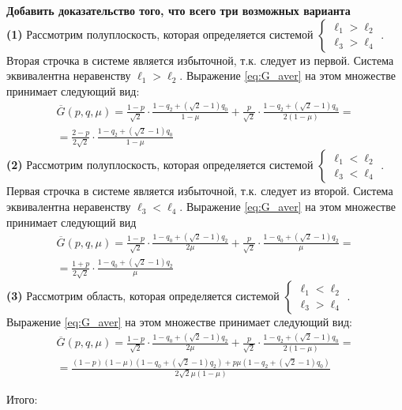 \textbf{Добавить доказательство того, что всего три возможных варианта}\\
\textbf{(1)} 
Рассмотрим полуплоскость, которая определяется системой
$
	\begin{cases}
		\ell_1 > \ell_2 \\
		\ell_3 > \ell_4
	\end{cases}.
$
Вторая строчка в системе является избыточной, т.к. следует из первой.
Система эквивалентна неравенству $\ell_1 > \ell_2$. Выражение \eqref{eq:G_aver} на этом множестве принимает следующий вид:
\begin{gather*}
	\overline G(p,q,\mu)=
	\frac{1-p}{\sqrt{2}} \cdot \frac{1-q_2+(\sqrt{2}-1)q_0}{1-\mu} + 
	\frac{p}{\sqrt{2}} \cdot \frac{1-q_2+(\sqrt{2}-1)q_0}{2(1-\mu)} = \\
	=\frac{2-p}{2\sqrt{2}}\cdot\frac{1-q_2+(\sqrt{2}-1)q_0}{1-\mu}		
\end{gather*}
\textbf{(2)}
Рассмотрим полуплоскость, которая определяется системой
$
	\begin{cases}
		\ell_1 < \ell_2 \\
		\ell_3 < \ell_4
	\end{cases}.
$
Первая строчка в системе является избыточной, т.к. следует из второй.
Система эквивалентна неравенству $\ell_3 < \ell_4$.
Выражение \eqref{eq:G_aver} на этом множестве принимает следующий вид
\begin{gather*}
	\overline G(p,q,\mu)=
	\frac{1-p}{\sqrt{2}} \cdot \frac{1-q_0+(\sqrt{2}-1)q_2}{2\mu} + 
	\frac{p}{\sqrt{2}} \cdot \frac{1-q_0+(\sqrt{2}-1)q_2}{\mu} = \\
	=\frac{1+p}{2\sqrt{2}}\cdot\frac{1-q_0+(\sqrt{2}-1)q_2}{\mu}		
\end{gather*}
\textbf{(3)}
Рассмотрим область, которая определяется системой
$
	\begin{cases}
		\ell_1 < \ell_2 \\
		\ell_3 > \ell_4
	\end{cases}.
$
Выражение \eqref{eq:G_aver} на этом множестве принимает следующий вид:	
\begin{gather*}	
	\overline G(p,q,\mu)=
	\frac{1-p}{\sqrt{2}} \cdot \frac{1-q_0+(\sqrt{2}-1)q_2}{2\mu} +
	\frac{p}{\sqrt{2}} \cdot \frac{1-q_2+(\sqrt{2}-1)q_0}{2(1-\mu)}=
	\\	
	=\frac{(1-p)(1-\mu)(1-q_0+(\sqrt{2}-1)q_2)+p\mu(1-q_2+(\sqrt{2}-1)q_0)}
	{2\sqrt{2}\mu(1-\mu)}
\end{gather*}
	
Итого: 

